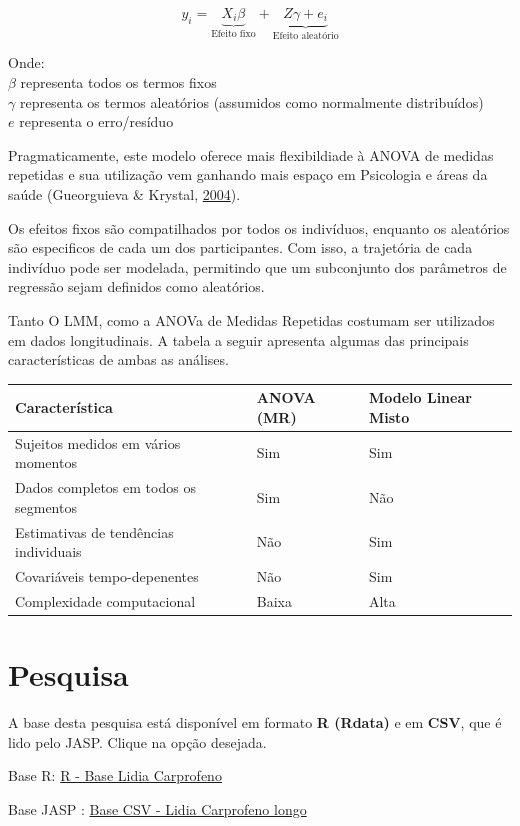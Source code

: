 \documentclass[
]{book}
\begin{document}
\[y_i = \underbrace{X_i\beta}_\text{Efeito fixo} + \underbrace{Z\gamma + e_i}_\text{Efeito aleatório}\]

Onde:\\
\(\beta\) representa todos os termos fixos\\
\(\gamma\) representa os termos aleatórios (assumidos como normalmente
distribuídos)\\
\(e\) representa o erro/resíduo

Pragmaticamente, este modelo oferece mais flexibildiade à ANOVA de
medidas repetidas e sua utilização vem ganhando mais espaço em
Psicologia e áreas da saúde (Gueorguieva \& Krystal,
\protect\hyperlink{ref-Gueorguieva2004}{2004}).

Os efeitos fixos são compatilhados por todos os indivíduos, enquanto os
aleatórios são especificos de cada um dos participantes. Com isso, a
trajetória de cada indivíduo pode ser modelada, permitindo que um
subconjunto dos parâmetros de regressão sejam definidos como aleatórios.

Tanto O LMM, como a ANOVa de Medidas Repetidas costumam ser utilizados
em dados longitudinais. A tabela a seguir apresenta algumas das
principais características de ambas as análises.

\begin{longtable}[]{@{}lll@{}}
\toprule
Característica & ANOVA (MR) & Modelo Linear Misto\tabularnewline
\midrule
\endhead
Sujeitos medidos em vários momentos & Sim & Sim\tabularnewline
Dados completos em todos os segmentos & Sim & Não\tabularnewline
Estimativas de tendências individuais & Não & Sim\tabularnewline
Covariáveis tempo-depenentes & Não & Sim\tabularnewline
Complexidade computacional & Baixa & Alta\tabularnewline
\bottomrule
\end{longtable}

\hypertarget{pesquisa-6}{%
\section{Pesquisa}\label{pesquisa-6}}

\begin{base}

A base desta pesquisa está disponível em formato \textbf{R (Rdata)} e em
\textbf{CSV}, que é lido pelo JASP. Clique na opção desejada.

Base R:
\href{https://github.com/anovabr/mqt/raw/master/bases/R\%20-\%20Base\%20Lidia\%20Carprofeno.RData}{R
- Base Lidia Carprofeno}

Base JASP :
\href{https://github.com/anovabr/mqt/raw/master/bases/bases_csv_jasp.zip}{Base
CSV - Lidia Carprofeno longo}

\end{base}
\end{document}
